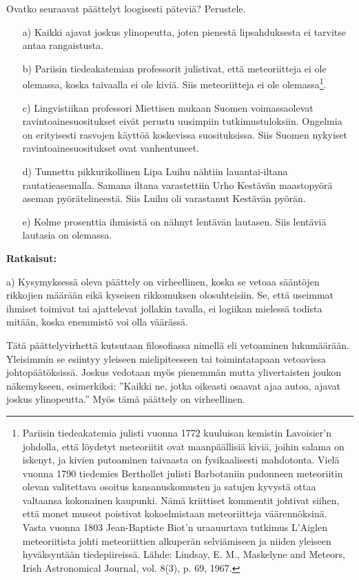 \begin{esimerkki}
Ovatko seuraavat päättelyt loogisesti päteviä? Perustele.
\begin{itemize}
\item[a)] Kaikki ajavat joskus ylinopeutta, joten pienestä lipsahduksesta ei tarvitse antaa rangaistusta.
\item[b)] Pariisin tiedeakatemian professorit julistivat, että meteoriitteja ei ole olemassa, koska taivaalla ei ole kiviä. Siis meteoriitteja ei ole olemassa\footnote{Pariisin tiedeakatemia julisti vuonna 1772 kuuluisan kemistin Lavoisier'n johdolla, että löydetyt meteoriitit ovat maanpäällisiä kiviä, joihin salama on iskenyt, ja kivien putoaminen taivaasta on fysikaalisesti mahdotonta. Vielä vuonna 1790 tiedemies Berthollet julisti Barbotaniin pudonneen meteoriitin olevan valitettava osoitus kansanuskomusten ja satujen kyvystä ottaa valtaansa kokonainen kaupunki. Nämä kriittiset kommentit johtivat siihen, että monet museot poistivat kokoelmistaan meteoriitteja väärennöksinä. Vasta vuonna 1803 Jean-Baptiste Biot'n uraauurtava tutkimus L'Aiglen meteoriitista johti meteoriittien alkuperän selviämiseen ja niiden yleiseen hyväksyntään tiedepiireissä. Lähde: Lindsay, E. M., Maskelyne and Meteors, Irish Astronomical Journal, vol. 8(3), p. 69, 1967.}.
\item[c)] Lingvistiikan professori Miettisen mukaan Suomen voimassaolevat ravintoainesuositukset eivät perustu uusimpiin tutkimustuloksiin. Ongelmia on erityisesti rasvojen käyttöä koskevissa suosituksissa. Siis Suomen nykyiset ravintoainesuositukset ovat vanhentuneet.
\item[d)] Tunnettu pikkurikollinen Lipa Luihu nähtiin lauantai-iltana rautatieasemalla. Samana iltana varastettiin Urho Kestävän maastopyörä aseman pyörätelineestä. Siis Luihu oli varastanut Kestävän pyörän.
\item[e)] Kolme prosenttia ihmisistä on nähnyt lentävän lautasen. Siis lentäviä lautasia on olemassa.
\end{itemize}

{\bf Ratkaisut:}

a) Kysymyksessä oleva päättely on virheellinen, koska se vetoaa sääntöjen rikkojien määrään eikä kyseisen rikkomuksen olosuhteisiin. Se, että useimmat ihmiset toimivat tai ajattelevat jollakin tavalla, ei logiikan mielessä todista mitään, koska enemmistö voi olla väärässä.

Tätä päättelyvirhettä kutsutaan filosofiassa nimellä  eli vetoaminen lukumäärään.  Yleisimmin se esiintyy yleiseen mielipiteeseen tai toimintatapaan vetoavissa johtopäätöksissä. Joskus vedotaan myös pienemmän mutta ylivertaisten joukon näkemykseen, esimerkiksi: ''Kaikki ne, jotka oikeasti osaavat ajaa autoa, ajavat joskus ylinopeutta.'' Myös tämä päättely on virheellinen.


\end{esimerkki}
